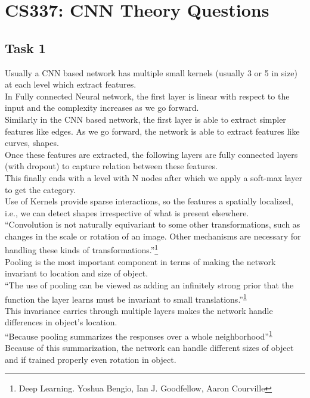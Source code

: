\documentclass[12pt, fleqn]{article}
\begin{document}
\newpage
\section{CS337: CNN Theory Questions}
\subsection{Task 1}
Usually a CNN based network has multiple small kernels (usually 3 or 5 in size) at each level which extract features. \\
In Fully connected Neural network, the first layer is linear with respect to the input and the complexity increases as we go forward. \\
Similarly in the CNN based network, the first layer is able to extract simpler features like edges. As we go forward, the network is able to extract features like curves, shapes. \\
Once these features are extracted, the following layers are fully connected layers (with dropout) to capture relation between these features. \\
This finally ends with a level with N nodes after which we apply a soft-max layer to get the category. \\

Use of Kernels provide sparse interactions, so the features a spatially localized, i.e., we can detect shapes irrespective of what is present elsewhere. \\
``Convolution is not naturally equivariant to some other transformations, such as changes in the scale or rotation of an image. Other mechanisms are necessary
for handling these kinds of transformations.''\footnote{\label{note1} Deep Learning. Yoshua Bengio, Ian J. Goodfellow, Aaron Courville} \\
Pooling is the most important component in terms of making the network invariant to location and size of object. \\
``The use of pooling can be viewed as adding an infinitely strong prior that the function the layer learns must be invariant to small translations.''\textsuperscript{\ref{note1}} \\
This invariance carries through multiple layers makes the network handle differences in object's location. \\
``Because pooling summarizes the responses over a whole neighborhood''\textsuperscript{\ref{note1}} \\
Because of this summarization, the network can handle different sizes of object and if trained properly even rotation in object. \\
\end{document}
